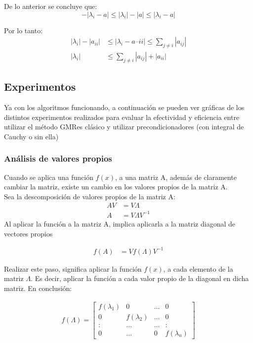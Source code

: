 \documentclass[fleqn]{article}
\begin{document}
De lo anterior se concluye que:
\begin{equation}
    -|\lambda_i - a| \leq |\lambda_i| - |a| \leq |\lambda_i - a|
\end{equation}

Por lo tanto:
\begin{align*}
    |\lambda_i| - |a_{ii}| &\leq |\lambda_i - a–{ii}| \leq \sum_{j \neq i}|a_{ij}| \\
    |\lambda_i| &\leq \sum_{j \neq i}|a_{ij}| + |a_{ii}|
\end{align*}

\subsection{Experimentos}

Ya con los algoritmos funcionando, a continuación se pueden ver gráficas de los distintos experimentos realizados para evaluar la efectividad y eficiencia entre utilizar el método GMRes clásico y utilizar precondicionadores (con integral de Cauchy o sin ella)

\subsubsection*{Análisis de valores propios}
Cuando se aplica una función $f(x)$, a una matriz A, además de claramente cambiar la matriz, existe un cambio en los valores propios de la matriz A.\\
Sea la descomposición de valores propios de la matriz A:
\begin{align}
    AV &= V\Lambda\\
    A &= V\Lambda V^{-1}
\end{align}
Al aplicar la función a la matriz A, implica aplicarla a la matriz diagonal de vectores propios

\begin{align}
    f(A) &= Vf(\Lambda)V^{-1}
\end{align}

Realizar este paso, significa aplicar la función $f(x)$, a cada elemento de la matriz $\Lambda$. Es decir, aplicar la función a cada valor propio de la diagonal en dicha matriz.
En conclusión:

\begin{align}
    f(\Lambda) =  \begin{bmatrix} 
f(\lambda_1) & 0 & ... & 0 \\ 
0  & f(\lambda_2) & ... & 0 \\
: & ... & ... & :\\
0  & ... & 0 & f(\lambda_n)
\end{bmatrix} 
\end{align}
\end{document}
